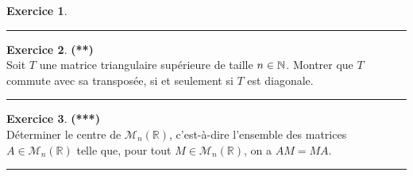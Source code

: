 \documentclass[a4paper,11pt]{article}
\theoremstyle{definition}
\newtheorem{exo}{Exercice} %
\begin{document}
\begin{minipage}{1\linewidth}
\begin{minipage}[t]{0.48\linewidth}
\begin{exo}
	\centering
	\rule{1\linewidth}{0.6pt}
\end{exo}

		
	\begin{exo}\textbf{(**)}\quad\\[0.2cm]
		Soit $T$ une matrice triangulaire supérieure de taille $n\in\mathbb{N}$. Montrer que $T$ commute avec sa transposée, si et seulement si $T$ est diagonale.	
		
				\centering
		\rule{1\linewidth}{0.6pt}
	\end{exo}
		
		\begin{exo}\textbf{(***)}\quad\\[0.2cm]
			Déterminer le centre de $\mathcal M_n(\mathbb R)$, c'est-à-dire l'ensemble des matrices $A\in\mathcal M_n(\mathbb R)$ telle que, pour tout $M\in\mathcal M_n(\mathbb R)$, on a $AM=MA$.
			
			\centering
			\rule{1\linewidth}{0.6pt}
		\end{exo}
		

		
		
	\end{minipage}
\end{minipage}
\end{document}
